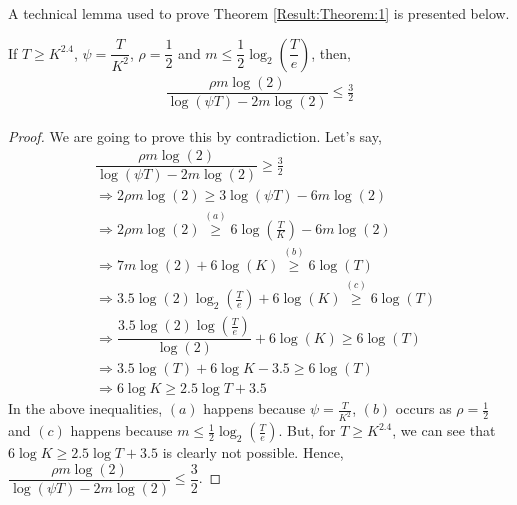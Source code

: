 A technical lemma used to prove Theorem \ref{Result:Theorem:1} is presented below.

\begin{lemma}
\label{proofTheorem:Lemma:1}
If $T\geq K^{2.4}$, $\psi=\dfrac{T}{ K^2}$, $\rho=\dfrac{1}{2}$ and $m\leq \dfrac{1}{2} \log_2(\dfrac{T}{e}) $, then,
\begin{align*}
\dfrac{\rho m \log(2)}{\log(\psi T) - 2m\log( 2)} \leq \frac{3}{2}
\end{align*}
\end{lemma}
\begin{proof}
We are going to prove this by contradiction. Let's say,
\begin{align*}
 & \dfrac{\rho m \log(2)}{\log(\psi T) - 2m\log( 2)} \geq \frac{3}{2} \\
 &\Rightarrow 2\rho m \log(2) \geq 3\log(\psi T) - 6m\log( 2) \\
 &\Rightarrow 2\rho m \log(2) \overset{(a)}{\geq} 6\log(\frac{T}{K}) - 6m\log( 2) \\
 &\Rightarrow 7 m \log(2) + 6\log(K) \overset{(b)}{\geq} 6\log(T) \\
 &\Rightarrow 3.5 \log(2) \log_2(\frac{T}{e}) + 6\log(K) \overset{(c)}{\geq} 6\log(T) \\
 &\Rightarrow \dfrac{3.5 \log (2) \log (\frac{T}{e})}{\log(2)} + 6\log(K) \geq 6\log(T)\\
 &\Rightarrow 3.5 \log(T) + 6\log K - 3.5 \geq 6\log (T)\\
 &\Rightarrow 6\log K \geq 2.5 \log T + 3.5 
\end{align*}
In the above inequalities, $(a)$ happens because $\psi=\frac{T}{K^2}$, $(b)$ occurs as $\rho=\frac{1}{2}$ and $(c)$ happens because $m\leq \frac{1}{2} \log_2(\frac{T}{e})$. But, for $T\geq K^{2.4}$, we can see that $6\log K \geq 2.5 \log T + 3.5$ is clearly not possible. Hence, $\dfrac{\rho m \log(2)}{\log(\psi T) - 2m\log( 2)} \leq \dfrac{3}{2}$.
\end{proof}

